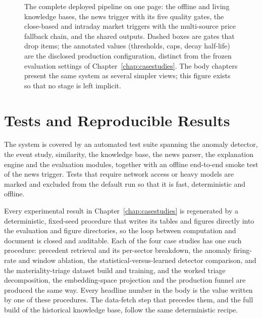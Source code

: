 \begin{figure}
\caption[The complete deployed pipeline, with every gate annotated]{The complete deployed pipeline on
one page: the offline and living knowledge bases, the news trigger with its five quality gates, the
close-based and intraday market triggers with the multi-source price fallback chain, and the shared
outputs. Dashed boxes are gates that drop items; the annotated values (thresholds, caps, decay
half-life) are the disclosed production configuration, distinct from the frozen evaluation settings of
Chapter~\ref{chap:casestudies}. The body chapters present the same system as several simpler views;
this figure exists so that no stage is left implicit.}
\label{fig:master_pipeline}
\end{figure}

\section{Tests and Reproducible Results}
\label{app:repro_tests}

The system is covered by an automated test suite spanning the anomaly detector, the event study,
similarity, the knowledge base, the news parser, the explanation engine and the evaluation modules,
together with an offline end-to-end smoke test of the news trigger. Tests that require network access or
heavy models are marked and excluded from the default run so that it is fast, deterministic and offline.

Every experimental result in Chapter~\ref{chap:casestudies} is regenerated by a deterministic,
fixed-seed procedure that writes its tables and figures directly into the evaluation and figure
directories, so the loop between computation and document is closed and auditable. Each of the four
case studies has one such procedure: precedent retrieval and its per-sector breakdown, the anomaly
firing-rate and window ablation, the statistical-versus-learned detector comparison, and the
materiality-triage dataset build and training, and the worked triage decomposition, the
embedding-space projection and the production funnel are produced the same way. Every headline number in
the body is the value written by one of these procedures. The data-fetch step
that precedes them, and the full build of the historical knowledge base, follow the same deterministic
recipe.

